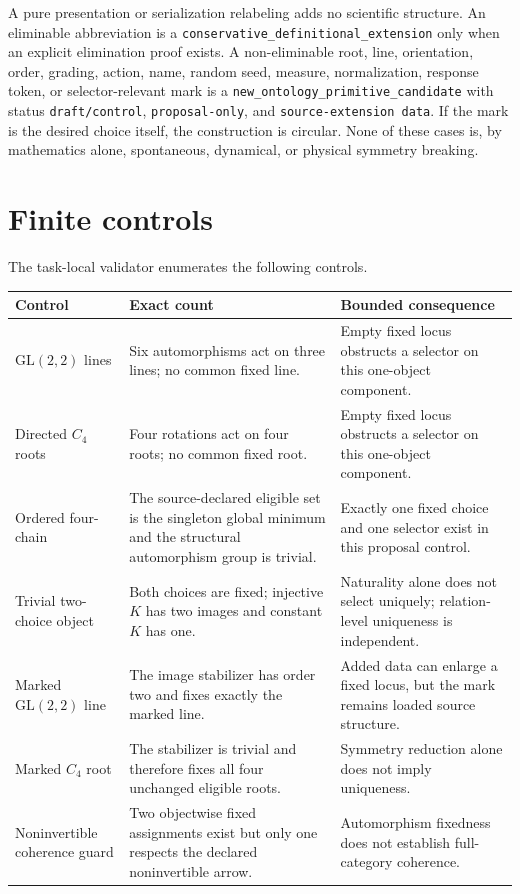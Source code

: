 \documentclass[11pt]{article}
\begin{document}
A pure presentation or serialization relabeling adds no scientific structure.
An eliminable abbreviation is a
\texttt{conservative\_definitional\_extension} only when an explicit
elimination proof exists. A non-eliminable root, line, orientation, order,
grading, action, name, random seed, measure, normalization, response token,
or selector-relevant mark is a
\texttt{new\_ontology\_primitive\_candidate} with status
\texttt{draft/control}, \texttt{proposal-only}, and
\texttt{source-extension data}. If the mark is the desired choice itself,
the construction is circular. None of these cases is, by mathematics alone,
spontaneous, dynamical, or physical symmetry breaking.

\section{Finite controls}

The task-local validator enumerates the following controls.

\begin{longtable}{>{\raggedright\arraybackslash}p{}
                  >{\raggedright\arraybackslash}p{}
                  >{\raggedright\arraybackslash}p{}}
\toprule
Control & Exact count & Bounded consequence \\
\midrule
\endhead
\(\mathrm{GL}(2,2)\) lines & Six automorphisms act on three lines; no
common fixed line. & Empty fixed locus obstructs a selector on this one-object
component. \\
Directed \(C_4\) roots & Four rotations act on four roots; no common fixed
root. & Empty fixed locus obstructs a selector on this one-object component. \\
Ordered four-chain & The source-declared eligible set is the singleton global
minimum and the structural automorphism group is trivial. & Exactly one fixed
choice and one selector exist in this proposal control. \\
Trivial two-choice object & Both choices are fixed; injective \(K\) has two
images and constant \(K\) has one. & Naturality alone does not select uniquely;
relation-level uniqueness is independent. \\
Marked \(\mathrm{GL}(2,2)\) line & The image stabilizer has order two and
fixes exactly the marked line. & Added data can enlarge a fixed locus, but the
mark remains loaded source structure. \\
Marked \(C_4\) root & The stabilizer is trivial and therefore fixes all four
unchanged eligible roots. & Symmetry reduction alone does not imply uniqueness. \\
Noninvertible coherence guard & Two objectwise fixed assignments exist but
only one respects the declared noninvertible arrow. & Automorphism fixedness
does not establish full-category coherence. \\
\bottomrule
\end{longtable}
\end{document}
